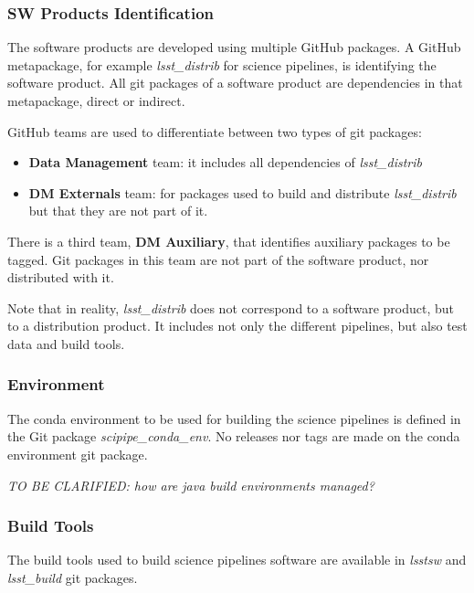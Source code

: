 \subsubsection{SW Products Identification} \label{sec:statusIdentification}

The software products are developed using multiple GitHub packages. 
A GitHub metapackage, for example \textit{lsst\_distrib} for science pipelines, is identifying the software product. 
All git packages of a software product are dependencies in that metapackage, direct or indirect.

GitHub teams are used to differentiate between two types of git packages:

\begin{itemize}
\item \textbf{Data Management} team: it includes all dependencies of \textit{lsst\_distrib}
\item \textbf{DM Externals} team: for packages used to build and distribute \textit{lsst\_distrib} but that they are not part of it.
\end{itemize}

There is a third team, \textbf{DM Auxiliary}, that identifies auxiliary packages to be tagged.
Git packages in this team are not part of the software product, nor distributed with it.

Note that in reality, \textit{lsst\_distrib} does not correspond to a software product, but to a distribution product.
It includes not only the different pipelines, but also test data and build tools.


\subsubsection{Environment} \label{sec:statusEnvs}

The conda environment to be used for building the science pipelines is defined in the Git package \textit{scipipe\_conda\_env}.
No releases nor tags are made  on the conda environment git package.

\textit{TO BE CLARIFIED: how are java build environments managed?}


\subsubsection{Build Tools} \label{sec:statusTools}

The build tools used to build science pipelines software are available in \textit{lsstsw} and \textit{lsst\_build} git packages.

